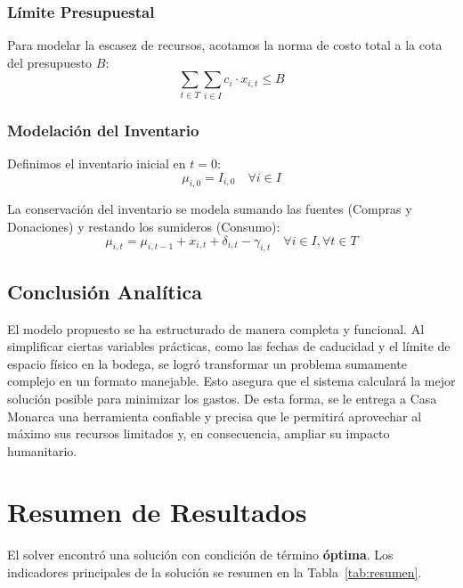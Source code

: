 \documentclass[12pt]{report}
\begin{document}
\subsection{Límite Presupuestal}
Para modelar la escasez de recursos, acotamos la norma de costo total a la cota del presupuesto $B$:
\begin{equation}
    \sum_{t \in T} \sum_{i \in I} c_i \cdot x_{i,t} \le B
\end{equation}

\subsection{Modelación del Inventario}
Definimos el inventario inicial en $t=0$:
\begin{equation}
    \mu_{i,0} = I_{i,0} \quad \forall i \in I
\end{equation}

La conservación del inventario se modela sumando las fuentes (Compras y Donaciones) y restando los sumideros (Consumo):
\begin{equation}
    \mu_{i,t} = \mu_{i,t-1} + x_{i,t} + \delta_{i,t} - \gamma_{i,t} \quad \forall i \in I, \forall t \in T
\end{equation}

\section{Conclusión Analítica}
El modelo propuesto se ha estructurado de manera completa y funcional. Al simplificar ciertas variables prácticas, como las fechas de caducidad y el límite de espacio físico en la bodega, se logró transformar un problema sumamente complejo en un formato manejable. Esto asegura que el sistema calculará la mejor solución posible para minimizar los gastos. De esta forma, se le entrega a Casa Monarca una herramienta confiable y precisa que le permitirá aprovechar al máximo sus recursos limitados y, en consecuencia, ampliar su impacto humanitario.




\chapter{Resumen de Resultados}

El solver encontró una solución con condición de término \textbf{óptima}. Los indicadores
principales de la solución se resumen en la Tabla~\ref{tab:resumen}.
\end{document}
